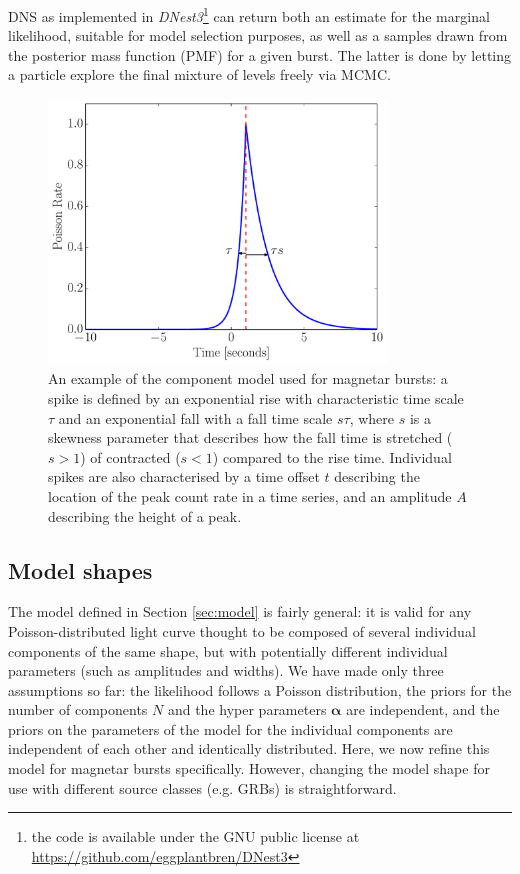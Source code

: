 \documentclass[12pt]{emulateapj}
\begin{document}
DNS as implemented in {\it DNest3}\footnote{the code is available under the GNU public license at \hyperref[]{https://github.com/eggplantbren/DNest3}} can return both an estimate for the marginal likelihood,
suitable for model selection purposes, as well as a samples drawn from the posterior mass function (PMF) for a given burst. The latter is done by letting a particle explore
the final mixture of levels freely via MCMC. 
\begin{figure}[h]
\begin{center}
\includegraphics[width=9cm]{word.pdf}
\caption{An example of the component model used for magnetar bursts: a spike is defined by an exponential rise with characteristic
time scale $\tau$ and an exponential fall with a fall time scale $s\tau$, where $s$ is a skewness parameter that describes how the fall
time is stretched ($s > 1$) of contracted ($s < 1$) compared to the rise time. Individual spikes are also characterised by a time offset
$t$ describing the location of the peak count rate in a time series, and an amplitude $A$ describing the height of a peak.}
\label{fig:word_example}
\end{center}
\end{figure}



\subsection{Model shapes}
\label{sec:wordmodel}

The model defined in Section \ref{sec:model} is fairly general: it is valid for any Poisson-distributed light curve thought to be composed of several individual components of
the same shape, but with potentially different individual parameters (such as amplitudes and widths). 
We have made only three assumptions so far: the likelihood follows a Poisson distribution, the priors for the number of components $N$ and the hyper parameters $\bm{\alpha}$ are independent,
and the priors on the parameters of the model for the individual components are independent of each other and identically distributed. 
Here, we now refine this model for magnetar bursts specifically. However, changing the model shape for use with different source classes (e.g. GRBs) is straightforward.
\end{document}
